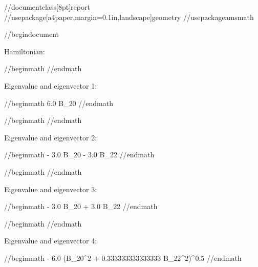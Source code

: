 //documentclass[8pt]{report}
//usepackage[a4paper,margin=0.1in,landscape]{geometry}
//usepackage{amsmath}

//begin{document}

Hamiltonian:

//begin{math}
//end{math}

Eigenvalue and eigenvector 1:

//begin{math}
6.0 B_{20}
//end{math}

//begin{math}
\left[\begin{matrix}-1.0\\0\\0\\0\\1.0\end{matrix}\right]
//end{math}

Eigenvalue and eigenvector 2:

//begin{math}
- 3.0 B_{20} - 3.0 B_{22}
//end{math}

//begin{math}
\left[\begin{matrix}0\\-1.0\\0\\1.0\\0\end{matrix}\right]
//end{math}

Eigenvalue and eigenvector 3:

//begin{math}
- 3.0 B_{20} + 3.0 B_{22}
//end{math}

//begin{math}
\left[\begin{matrix}0\\1.0\\0\\1.0\\0\end{matrix}\right]
//end{math}

Eigenvalue and eigenvector 4:

//begin{math}
- 6.0 \left(B_{20}^{2} + 0.333333333333333 B_{22}^{2}\right)^{0.5}
//end{math}

